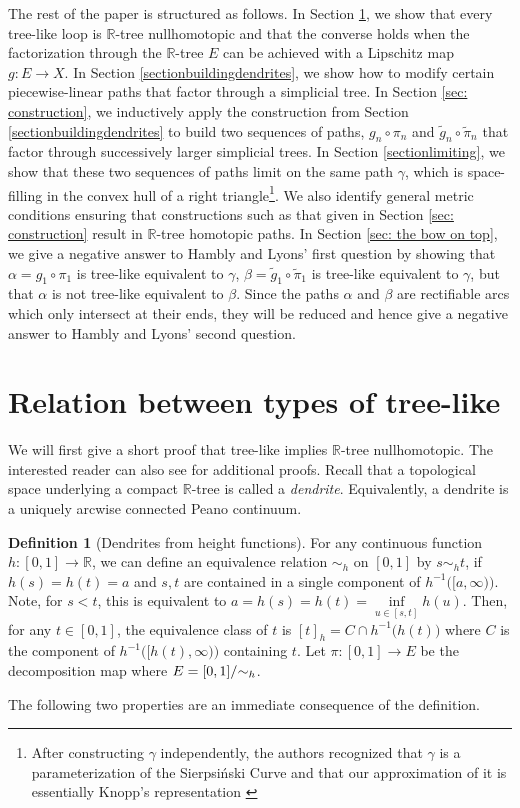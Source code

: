 \documentclass[11pt, leqno]{amsart}
\theoremstyle{definition}\newtheorem{definition}[theorem]{Definition}
\begin{document}
The rest of the paper is structured as follows. In Section \ref{sectionrelationbwtypes}, we show that every tree-like loop is $\mathbb{R}$-tree nullhomotopic and that the converse holds when the factorization through the $\mathbb{R}$-tree $E$ can be achieved with a Lipschitz map $g:E\to X$. In Section \ref{sectionbuildingdendrites}, we show how to modify certain piecewise-linear paths that factor through a simplicial tree.   In Section \ref{sec: construction}, we inductively apply the construction from Section \ref{sectionbuildingdendrites} to build two sequences of paths, $g_n\circ \pi_n$ and $\tilde g_n\circ\tilde \pi_n$ that factor through successively larger simplicial trees. In Section \ref{sectionlimiting}, we show that these two sequences of paths limit on the same path $\gamma$, which is space-filling in the convex hull of a right triangle\footnote{After constructing $\gamma$ independently, the authors recognized that $\gamma$ is a parameterization of the Sierpsi\'nski Curve and that our approximation of it is essentially Knopp's representation \cite[Section 4.2]{Sagan1994}}. We also identify general metric conditions ensuring that constructions such as that given in Section \ref{sec: construction} result in $\mathbb{R}$-tree homotopic paths. In Section \ref{sec: the bow on top}, we give a negative answer to Hambly and Lyons' first question by showing that $\alpha=g_1\circ\pi_1$ is tree-like equivalent to $\gamma$, $\beta=\tilde g_1\circ\tilde \pi_1$ is tree-like equivalent to $\gamma$, but that $\alpha$ is not tree-like equivalent to $\beta$. Since the paths $\alpha$ and $\beta$ are rectifiable arcs which only intersect at their ends, they will be reduced and hence give a negative answer to Hambly and Lyons' second question.

\section{Relation between types of tree-like}\label{sectionrelationbwtypes}
We will first give a short proof that tree-like implies $\mathbb R$-tree nullhomotopic. The interested reader can also see \cite{Duquesne2006,HamblyLyonsNotes,  LeGall1991} for additional proofs. Recall that a topological space underlying a compact $\mathbb{R}$-tree is called a \textit{dendrite}. Equivalently, a dendrite is a uniquely arcwise connected Peano continuum.

\begin{definition}[Dendrites from height functions]
    For any continuous function $h:[0,1]\to\mathbb R$, we can define an equivalence relation $\sim_h$ on $[0,1]$ by $s\sim_h t$, if $h(s)= h(t)=a$ and $s,t$ are contained in a single component of $h^{-1}\big([a,\infty)\big)$.  Note, for  $s<t$, this is equivalent to $a= h(s) = h(t) = \inf\limits_{u\in[s,t]} h(u)$.  Then, for any $t\in [0,1]$, the  equivalence class of $t$ is $[t]_h = C\cap h^{-1}\big(h(t)\big)$ where $C$ is the component of  $h^{-1}\big([h(t), \infty) \big)$ containing $t$.      Let $\pi: [0,1]\to E$ be the decomposition map where $E = [0,1]/\hspace{-.25em}\sim_h$. 
\end{definition}
     The following two properties are an immediate consequence of the definition.
\end{document}
